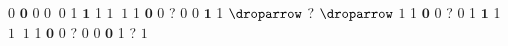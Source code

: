 0 $\mathbf{0}$ 0     $0$     $\:0$
1 $\mathbf{1}$ 1     $1$     $\:1$
1 $\mathbf{0}$ 0     ?    $\boxed{0}$
0 $\mathbf{1}$ 1  $\droparrow$   ? $\droparrow$   $\boxed{1}$
1 $\mathbf{0}$ 0     ?    $\boxed{0}$
1 $\mathbf{1}$ 1     $1$     $\:1$
1 $\mathbf{0}$ 0     ?    $\boxed{0}$
0 $\mathbf{0}$ 1     ?    $\boxed{1}$
